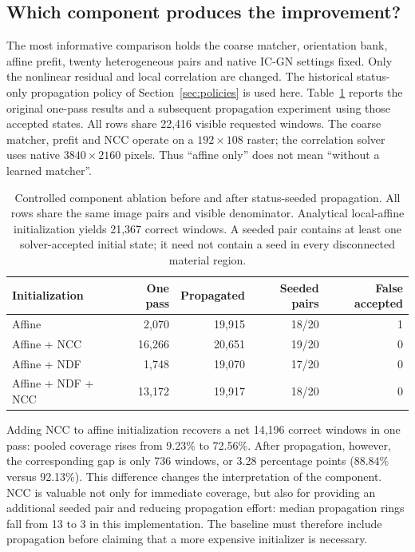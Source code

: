 \subsection{Which component produces the improvement?}
The most informative comparison holds the coarse matcher, orientation bank, affine prefit, twenty heterogeneous pairs and native IC-GN settings fixed. Only the nonlinear residual and local correlation are changed. The historical status-only propagation policy of Section~\ref{sec:policies} is used here. Table~\ref{tab:causal} reports the original one-pass results and a subsequent propagation experiment using those accepted states. All rows share 22,416 visible requested windows. The coarse matcher, prefit and NCC operate on a $192\times108$ raster; the correlation solver uses native $3840\times2160$ pixels. Thus ``affine only'' does not mean ``without a learned matcher''.

\begin{table}[tb]\centering\small
\caption{Controlled component ablation before and after status-seeded propagation. All rows share the same image pairs and visible denominator. Analytical local-affine initialization yields 21,367 correct windows. A seeded pair contains at least one solver-accepted initial state; it need not contain a seed in every disconnected material region.}\label{tab:causal}
\begin{tabular}{lrrrr}\toprule
Initialization & One pass & Propagated & Seeded pairs & False accepted\\\midrule
Affine & 2,070 & 19,915 &18/20&1\\
Affine + NCC &16,266&20,651&19/20&0\\
Affine + NDF &1,748&19,070&17/20&0\\
Affine + NDF + NCC &13,172&19,917&18/20&0\\\bottomrule
\end{tabular}\end{table}

Adding NCC to affine initialization recovers a net 14,196 correct windows in one pass: pooled coverage rises from 9.23\% to 72.56\%. After propagation, however, the corresponding gap is only 736 windows, or 3.28 percentage points (88.84\% versus 92.13\%). This difference changes the interpretation of the component. NCC is valuable not only for immediate coverage, but also for providing an additional seeded pair and reducing propagation effort: median propagation rings fall from 13 to 3 in this implementation. The baseline must therefore include propagation before claiming that a more expensive initializer is necessary.

